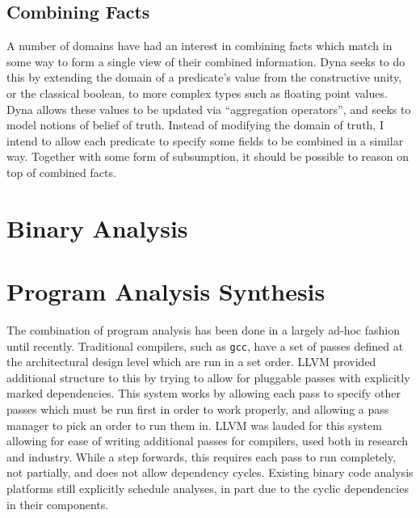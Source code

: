 \subsection{Combining Facts}
A number of domains have had an interest in combining facts which match in some way to form a single view of their combined information.
Dyna\cite{dyna} seeks to do this by extending the domain of a predicate's value from the constructive unity, or the classical boolean, to more complex types such as floating point values.
Dyna allows these values to be updated via ``aggregation operators'', and seeks to model notions of belief of truth.
Instead of modifying the domain of truth, I intend to allow each predicate to specify some fields to be combined in a similar way.
Together with some form of subsumption, it should be possible to reason on top of combined facts.
\section{Binary Analysis}
\section{Program Analysis Synthesis}
The combination of program analysis has been done in a largely ad-hoc fashion until recently.
Traditional compilers, such as \texttt{gcc}, have a set of passes defined at the architectural design level which are run in a set order.
LLVM\cite{llvm} provided additional structure to this by trying to allow for pluggable passes with explicitly marked dependencies.
This system works by allowing each pass to specify other passes which must be run first in order to work properly, and allowing a pass manager to pick an order to run them in.
LLVM was lauded for this system allowing for ease of writing additional passes for compilers, used both in research and industry.
While a step forwards, this requires each pass to run completely, not partially, and does not allow dependency cycles.
Existing binary code analysis platforms\cite{jakstab,bap} still explicitly schedule analyses, in part due to the cyclic dependencies in their components.
